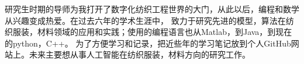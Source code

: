 \cvsection{}


\begin{cvparagraph}
研究生时期的导师为我打开了数字化纺织工程世界的大门，从此以后，编程和数学从兴趣变成热爱。在过去六年的学术生涯中，
致力于研究先进的模型，算法在纺织服装，材料领域的应用和实践；使用的编程语言也从Matlab，到Java，到现在的python，C++。
为了方便学习和记录，把近些年的学习笔记放到个人GitHub网站上。未来主要想从事人工智能在纺织服装，材料方向的研究工作。
\end{cvparagraph}

